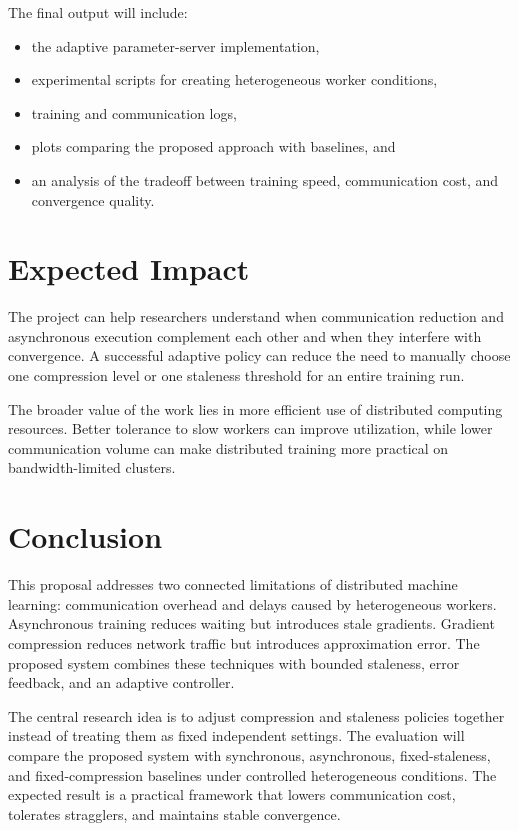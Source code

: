 \documentclass[conference]{IEEEtran}
\begin{document}
The final output will include:
\begin{itemize}
    \item the adaptive parameter-server implementation,
    \item experimental scripts for creating heterogeneous worker conditions,
    \item training and communication logs,
    \item plots comparing the proposed approach with baselines, and
    \item an analysis of the tradeoff between training speed, communication cost, and convergence quality.
\end{itemize}

\section{Expected Impact}

The project can help researchers understand when communication reduction and asynchronous execution complement each other and when they interfere with convergence. A successful adaptive policy can reduce the need to manually choose one compression level or one staleness threshold for an entire training run.

The broader value of the work lies in more efficient use of distributed computing resources. Better tolerance to slow workers can improve utilization, while lower communication volume can make distributed training more practical on bandwidth-limited clusters.

\section{Conclusion}

This proposal addresses two connected limitations of distributed machine learning: communication overhead and delays caused by heterogeneous workers. Asynchronous training reduces waiting but introduces stale gradients. Gradient compression reduces network traffic but introduces approximation error. The proposed system combines these techniques with bounded staleness, error feedback, and an adaptive controller.

The central research idea is to adjust compression and staleness policies together instead of treating them as fixed independent settings. The evaluation will compare the proposed system with synchronous, asynchronous, fixed-staleness, and fixed-compression baselines under controlled heterogeneous conditions. The expected result is a practical framework that lowers communication cost, tolerates stragglers, and maintains stable convergence.
\end{document}
